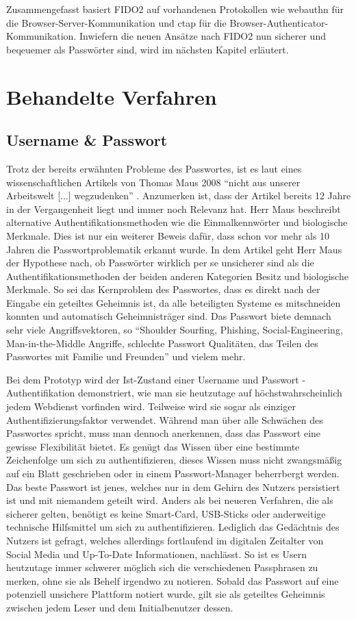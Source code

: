 Zusammengefasst basiert FIDO2 auf vorhandenen Protokollen wie \ac{webauthn} für die Browser-Server-Kommunikation und \ac{ctap} für die Browser-Authenticator-Kommunikation. Inwiefern die neuen Ansätze nach FIDO2 nun sicherer und beqeuemer als Passwörter sind, wird im nächsten Kapitel erläutert.
\newpage

\section{Behandelte Verfahren}
\subsection{Username \& Passwort}
Trotz der bereits erwähnten Probleme des Passwortes, ist es laut eines wissenschaftlichen Artikels von Thomas Maus 2008 ``nicht aus unserer Arbeitswelt [...] wegzudenken'' \cite{A9}. Anzumerken ist, dass der Artikel bereits 12 Jahre in der Vergangenheit liegt und immer noch Relevanz hat. Herr Maus beschreibt alternative Authentifikationsmethoden wie die Einmalkennwörter und biologische Merkmale. Dies ist nur ein weiterer Beweis dafür, dass schon vor mehr als 10 Jahren die Passwortproblematik erkannt wurde. In dem Artikel geht Herr Maus der Hypothese nach, ob Passwörter wirklich per se unsicherer sind als die Authentifikationsmethoden der beiden anderen Kategorien Besitz und biologische Merkmale. So sei das Kernproblem des Passwortes, dass es direkt nach der Eingabe ein geteiltes Geheimnis ist, da alle beteiligten Systeme es mitschneiden konnten und automatisch Geheimnisträger sind. Das Passwort biete demnach sehr viele Angriffsvektoren, so ``Shoulder Sourfing, Phishing, Social-Engineering, Man-in-the-Middle Angriffe, schlechte Passwort Qualitäten, das Teilen des Passwortes mit Familie und Freunden'' \cite{A9} und vielem mehr.

Bei dem Prototyp wird der Ist-Zustand einer Username und Passwort - Authentifikation demonstriert, wie man sie heutzutage auf höchstwahrscheinlich jedem Webdienst vorfinden wird. Teilweise wird sie sogar als einziger Authentifizierungsfaktor verwendet. Während man über alle Schwächen des Passwortes spricht, muss man dennoch anerkennen, dass das Passwort eine gewisse Flexibilität bietet. Es genügt das Wissen über eine bestimmte Zeichenfolge um sich zu authentifizieren, dieses Wissen muss nicht zwangsmäßig auf ein Blatt geschrieben oder in einem Passwort-Manager beherrbergt werden. Das beste Passwort ist jenes, welches nur in dem Gehirn des Nutzers persistiert ist und mit niemandem geteilt wird. Anders als bei neueren Verfahren, die als sicherer gelten, benötigt es keine Smart-Card, USB-Sticks oder anderweitige technische Hilfsmittel um sich zu authentifizieren. Lediglich das Gedächtnis des Nutzers ist gefragt, welches allerdings fortlaufend im digitalen Zeitalter von Social Media und Up-To-Date Informationen, nachlässt. So ist es Usern heutzutage immer schwerer möglich sich die verschiedenen Passphrasen zu merken, ohne sie als Behelf irgendwo zu notieren. Sobald das Passwort auf eine potenziell unsichere Plattform notiert wurde, gilt sie als geteiltes Geheimnis zwischen jedem Leser und dem Initialbenutzer dessen.
\newpage

